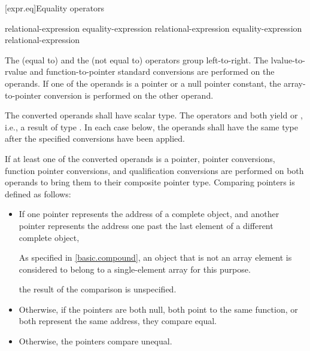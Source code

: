 [expr.eq]{Equality operators}%
%
%

\begin{bnf}
\br
    relational-expression\br
    equality-expression \terminal{==} relational-expression\br
    equality-expression \terminal{!=} relational-expression
\end{bnf}

\pnum
The \tcode{==} (equal to) and the \tcode{!=} (not equal to) operators
group left-to-right.
The
lvalue-to-rvalue
and function-to-pointer
standard conversions are performed on the operands.
If one of the operands is a pointer or a null pointer constant,
the array-to-pointer conversion is performed
on the other operand.

\pnum
The converted operands shall have scalar type. The operators
\tcode{==} and \tcode{!=} both yield  or , i.e., a
result of type . In each case below, the operands shall have the
same type after the specified conversions have been applied.

\pnum
{}%
%
If at least one of the converted operands is a pointer,
pointer conversions,
function pointer conversions, and
qualification conversions
are performed on both operands to bring them to their composite pointer type.
Comparing pointers is defined as follows:

\begin{itemize}
\item
If one pointer represents the address of a complete object, and another
pointer represents the address one past the last element of a different
complete object,
\begin{footnote}
As specified in \ref{basic.compound},
an object that is not an array element is
considered to belong to a single-element array for this purpose.
\end{footnote}
the result of the comparison is unspecified.
\item
Otherwise, if the pointers are both null, both point to the same
%
function, or both represent the same address,
they compare equal.
\item
Otherwise, the pointers compare unequal.
\end{itemize}

